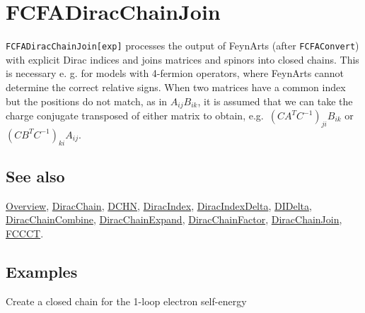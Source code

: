 \documentclass[../FeynCalcManual.tex]{subfiles}
\begin{document}
\hypertarget{fcfadiracchainjoin}{%
\section{FCFADiracChainJoin}\label{fcfadiracchainjoin}}

\texttt{FCFADiracChainJoin[\allowbreak{}exp]} processes the output of
FeynArts (after \texttt{FCFAConvert}) with explicit Dirac indices and
joins matrices and spinors into closed chains. This is necessary e. g.
for models with 4-fermion operators, where FeynArts cannot determine the
correct relative signs. When two matrices have a common index but the
positions do not match, as in \(A_{ij} B_{ik}\), it is assumed that we
can take the charge conjugate transposed of either matrix to obtain,
e.g.~\(\left(C A^T C^{-1}\right)_{ji} B_{ik}\) or
\(\left(C B^TC^{-1}\right)_{ki} A_{ij}\).

\subsection{See also}

\hyperlink{toc}{Overview}, \hyperlink{diracchain}{DiracChain},
\hyperlink{dchn}{DCHN}, \hyperlink{diracindex}{DiracIndex},
\hyperlink{diracindexdelta}{DiracIndexDelta},
\hyperlink{didelta}{DIDelta},
\hyperlink{diracchaincombine}{DiracChainCombine},
\hyperlink{diracchainexpand}{DiracChainExpand},
\hyperlink{diracchainfactor}{DiracChainFactor},
\hyperlink{diracchainjoin}{DiracChainJoin}, \hyperlink{fccct}{FCCCT}.

\subsection{Examples}

Create a closed chain for the 1-loop electron self-energy
\end{document}
